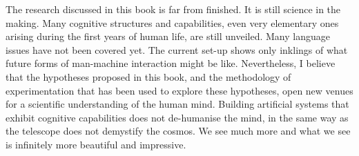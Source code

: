 The research discussed in this book is far from finished. It is 
still science in the making. Many cognitive structures
and capabilities, even very elementary ones arising 
during the first years of human life, are still unveiled. Many
language issues
have not been covered yet. The current set-up 
shows only inklings of what future forms of man-machine
interaction might be like. Nevertheless, I believe that 
the hypotheses proposed in this book, and the 
methodology of experimentation that has been used to 
explore these hypotheses, open new venues for 
a scientific understanding of the human mind. Building 
artificial systems that exhibit cognitive capabilities
does not de-humanise the mind, in the 
same way as the telescope does not demystify the cosmos. 
We see much more and what we see is infinitely more 
beautiful and impressive. 

%
